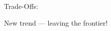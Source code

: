 \documentclass[
    xcolor={svgnames,dvipsnames},
    hyperref={colorlinks, citecolor=DeepPink4, linkcolor=DarkRed, urlcolor=DarkBlue}
    ]{beamer}  %
\newcommand{\1}{\mathbbm 1}
\begin{document}
\begin{frame}

    Trade-Offs:
    
    \begin{figure}
        \centering
    \end{figure}


\end{frame}



\begin{frame}[fragile]

    New trend --- leaving the frontier!

\end{frame}




\begin{frame}
    
    \begin{figure}
        \centering
    \end{figure}

\end{frame}
\end{document}
